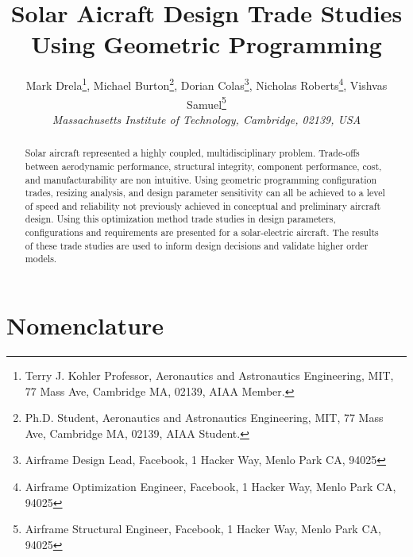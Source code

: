 \documentclass[]{aiaa-tc}%
\title{Solar Aicraft Design Trade Studies Using Geometric Programming}
\author{
  Mark Drela\thanks{Terry J. Kohler Professor, Aeronautics and Astronautics Engineering, MIT, 77 Mass Ave, Cambridge MA, 02139, AIAA Member.}, 
  Michael Burton\thanks{Ph.D. Student, Aeronautics and Astronautics Engineering, MIT, 77 Mass Ave, Cambridge MA, 02139, AIAA Student.}, 
  Dorian Colas\thanks{Airframe Design Lead, Facebook, 1 Hacker Way, Menlo Park CA, 94025}, 
  Nicholas Roberts\thanks{Airframe Optimization Engineer, Facebook, 1 Hacker Way, Menlo Park CA, 94025}, 
  Vishvas Samuel\thanks{Airframe Structural Engineer, Facebook, 1 Hacker Way, Menlo Park CA, 94025}\\
  {\normalsize\itshape
   Massachusetts Institute of Technology, Cambridge, 02139, USA}\\
 }
\begin{document}
\graphicspath{{./figs/}} 
\maketitle

\begin{abstract}
    Solar aircraft represented a highly coupled, multidisciplinary problem. 
    Trade-offs between aerodynamic performance, structural integrity, component performance, cost, and manufacturability are non intuitive. 
    Using geometric programming configuration trades, resizing analysis, and design parameter sensitivity can all be achieved to a level of speed and reliability not previously achieved in conceptual and preliminary aircraft design. 
    Using this optimization method trade studies in design parameters, configurations and requirements are presented for a solar-electric aircraft.  
    The results of these trade studies are used to inform design decisions and validate higher order models. 
\end{abstract}

\section*{Nomenclature}
\end{document}
